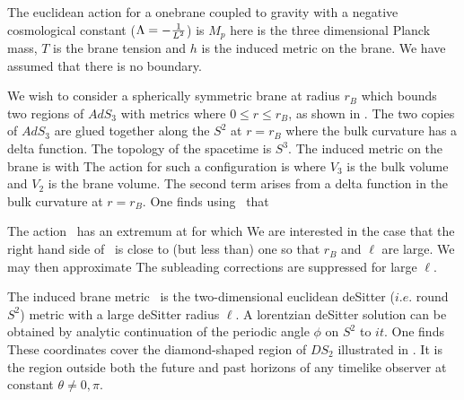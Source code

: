 
The euclidean action for a onebrane coupled to gravity with a negative
cosmological constant ($\Lambda=-{1 \over L^2}$) is
 \eqn{}
 $M_p$ here is the three dimensional Planck mass,
$T$ is the brane tension and $h$ is the induced metric on the
 brane. We have assumed that there is no boundary.
 
 \ifig{}


 We wish to consider a spherically symmetric brane at radius $r_B$
 which bounds two regions of $AdS_3$ with metrics
 \eqn{}
 where $0\le r \le r_B$, as shown in \feuclidean .
 The two copies of $AdS_3$ are glued together along
 the $S^2$ at
$r=r_B$ where the bulk curvature has a delta function. The topology of
the spacetime is $S^3$.
 The induced metric on the brane is
 \eqn{}
with
\eqn{}
 The action for such a configuration is
 \eqn{}
 where $V_3$ is the bulk volume and $V_2$ is the brane volume.
The second term arises from a delta function in the bulk curvature at
$r= r_B$.
One finds using \asgm\ that
 \eqn{}


The action \tryu\ has an extremum at
\eqn{}
for which
\eqn{}
We are interested in the case that the right hand side of \trl\ is close to
(but less than) one so that $r_B$ and $\ell$ are large.
We may then approximate
\eqn{}
The subleading corrections are suppressed for large $\ell$.


The induced brane metric
\bgm\ is the two-dimensional euclidean deSitter ($i.e.$ round $S^2$) metric
with a large
deSitter radius $\ell $.
A lorentzian deSitter solution can be obtained by
analytic continuation of the periodic angle $\phi$ on $S^2$ to
$it$. One finds
\eqn{}
\ifig{}
These coordinates cover the diamond-shaped region of $DS_2$
illustrated in \fpenrose . It is the region outside both
the future and past horizons of any timelike
observer at constant $\theta \neq 0, \pi$.






